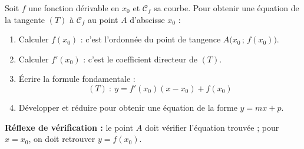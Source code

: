 \documentclass[11pt]{article}
\begin{document}
\begin{methode}
Soit $f$ une fonction dérivable en $x_0$ et $\mathcal{C}_f$ sa courbe. Pour obtenir une équation de la tangente $(T)$ à $\mathcal{C}_f$ au point $A$ d'abscisse $x_0$ :
\begin{enumerate}
\item Calculer $f(x_0)$ : c'est l'ordonnée du point de tangence $A\big(x_0\,;\,f(x_0)\big)$.
\item Calculer $f'(x_0)$ : c'est le coefficient directeur de $(T)$.
\item Écrire la formule fondamentale :
\[ \boxed{(T)\ :\ y=f'(x_0)(x-x_0)+f(x_0)} \]
\item Développer et réduire pour obtenir une équation de la forme $y=mx+p$.
\end{enumerate}
\textbf{Réflexe de vérification :} le point $A$ doit vérifier l'équation trouvée ; pour $x=x_0$, on doit retrouver $y=f(x_0)$.
\end{methode}
\end{document}
